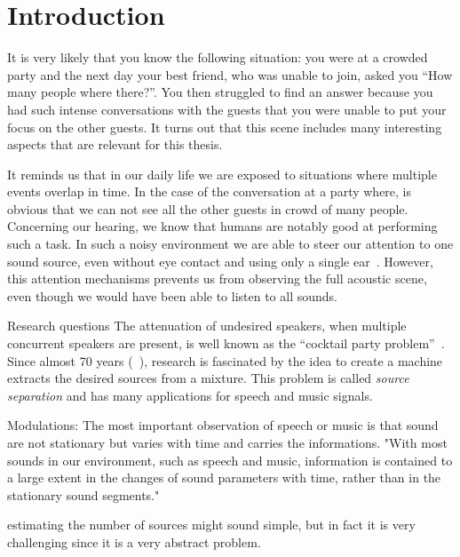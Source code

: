 \chapter{Introduction}\label{ch:introduction}

It is very likely that you know the following situation: you were at a crowded party and the next day your best friend, who was unable to join, asked you ``How many people where there?''. 
You then struggled to find an answer because you had such intense conversations with the guests that you were unable to put your focus on the other guests.
It turns out that this scene includes many interesting aspects that are relevant for this thesis.
\par
It reminds us that in our daily life we are exposed to situations where multiple events overlap in time.
In the case of the conversation at a party where, is obvious that we can not see all the other guests in crowd of many people.
Concerning our hearing, we know that humans are notably good at performing such a task.
In such a noisy environment we are able to steer our attention to one sound source, even without eye contact and using only a single ear~\cite{bregman90}.
However, this attention mechanisms prevents us from observing the full acoustic scene, even though we would have been able to listen to all sounds.
\par



Research questions
The attenuation of undesired speakers, when multiple concurrent speakers are present, is well known as the ``cocktail party problem''~\cite{haykin05}.
Since almost 70 years (~\cite{cherry53}), research is fascinated by the idea to create a machine extracts the desired sources from a mixture.
This problem is called \emph{source separation} and has many applications for speech and music signals.



Modulations:
The most important observation of speech or music is that sound are not stationary but varies with time and carries the informations.
"With most sounds in our environment, such as speech and music, information is contained to a large extent in the changes of sound parameters with time, rather than in the stationary sound segments."

estimating the number of sources might sound simple, but in fact it is very challenging since it is a very abstract problem.

